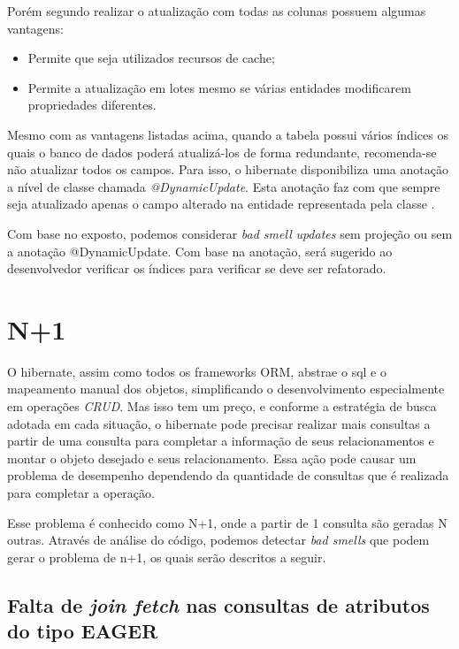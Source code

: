 Porém segundo \cite{hibernate_543} realizar o atualização com todas as colunas possuem algumas vantagens: 

\begin{itemize}
    \item Permite que seja utilizados recursos de cache;
    \item Permite a atualização em lotes mesmo se várias entidades modificarem propriedades diferentes.
\end{itemize}

Mesmo com as vantagens listadas acima, quando a tabela possui vários índices os quais o banco de dados poderá atualizá-los de forma redundante, recomenda-se não atualizar todos os campos. Para isso, o hibernate disponibiliza uma anotação a nível de classe chamada \textit{@DynamicUpdate}. Esta anotação faz com que sempre seja atualizado apenas o campo alterado na entidade representada pela classe \citep{hibernate_543}.

Com base no exposto, podemos considerar \textit{bad smell} \textit{updates} sem projeção ou sem a anotação @DynamicUpdate. Com base na anotação, será sugerido ao desenvolvedor verificar os índices para verificar se deve ser refatorado.

\section{N+1}
\label{n1}

O hibernate, assim como todos os frameworks ORM, abstrae o sql e o mapeamento manual dos objetos, simplificando o desenvolvimento especialmente em operações \textit{CRUD}. Mas isso tem um preço, e conforme a estratégia de busca adotada em cada situação, o hibernate pode precisar realizar mais consultas a partir de uma consulta para completar a informação de seus relacionamentos e montar o objeto desejado e seus relacionamento. Essa ação pode causar um problema de desempenho dependendo da quantidade de consultas que é realizada para completar a operação.\citep{vlad_mihalcea_n1}

Esse problema é conhecido como N+1, onde a partir de 1 consulta são geradas N outras. Através de análise do código, podemos detectar \textit{bad smells} que podem gerar o problema de n+1, os quais serão descritos a seguir.

\subsection{Falta de \textit{join fetch} nas consultas de atributos do tipo EAGER}

